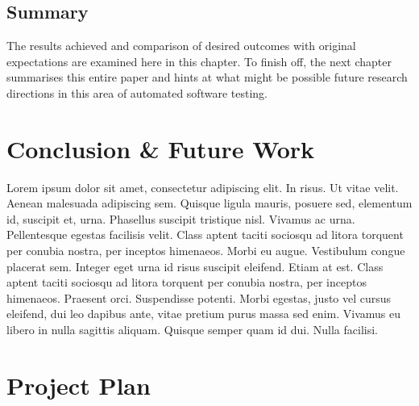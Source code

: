 \documentclass{icldt}
\numberwithin{equation}{section}       %
\begin{document}
\section{Summary}
The results achieved and comparison of desired outcomes with original expectations are examined here in this chapter. To finish off, the next chapter summarises this entire paper and hints at what might be possible future research directions in this area of automated software testing.
\chapter{Conclusion \& Future Work}
\label{ch:conclusion}
Lorem ipsum dolor sit amet, consectetur adipiscing elit. In risus. Ut vitae velit. Aenean malesuada adipiscing sem. Quisque ligula mauris, posuere sed, elementum id, suscipit et, urna. Phasellus suscipit tristique nisl. Vivamus ac urna. Pellentesque egestas facilisis velit. Class aptent taciti sociosqu ad litora torquent per conubia nostra, per inceptos himenaeos. Morbi eu augue. Vestibulum congue placerat sem. Integer eget urna id risus suscipit eleifend. Etiam at est. Class aptent taciti sociosqu ad litora torquent per conubia nostra, per inceptos himenaeos. Praesent orci. Suspendisse potenti. Morbi egestas, justo vel cursus eleifend, dui leo dapibus ante, vitae pretium purus massa sed enim. Vivamus eu libero in nulla sagittis aliquam. Quisque semper quam id dui. Nulla facilisi.
\chapter{Project Plan}
\end{document}
